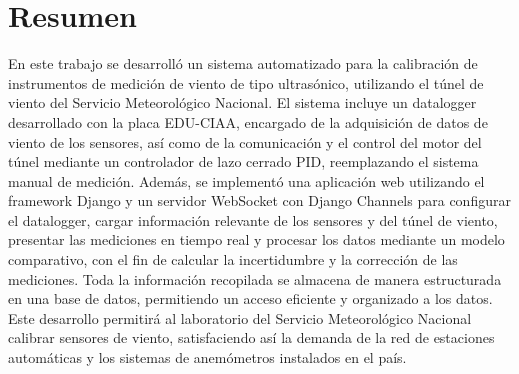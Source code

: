 \chapter*{Resumen}
En este trabajo se desarrolló un sistema automatizado para la calibración de instrumentos de medición de viento de tipo ultrasónico, utilizando el túnel de viento del Servicio Meteorológico Nacional. El sistema incluye un datalogger desarrollado con la placa EDU-CIAA, encargado de la adquisición de datos de viento de los sensores, así como de la comunicación y el control del motor del túnel mediante un controlador de lazo cerrado PID, reemplazando el sistema manual de medición. Además, se implementó una aplicación web utilizando el framework Django y un servidor WebSocket con Django Channels para configurar el datalogger, cargar información relevante de los sensores y del túnel de viento, presentar las mediciones en tiempo real y procesar los datos mediante un modelo comparativo, con el fin de calcular la incertidumbre y la corrección de las mediciones. Toda la información recopilada se almacena de manera estructurada en una base de datos, permitiendo un acceso eficiente y organizado a los datos. Este desarrollo permitirá al laboratorio del Servicio Meteorológico Nacional calibrar sensores de viento, satisfaciendo así la demanda de la red de estaciones automáticas y los sistemas de anemómetros instalados en el país.

